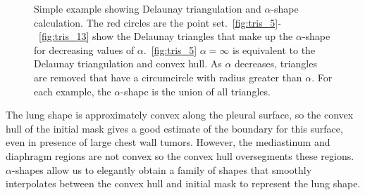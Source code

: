 \documentclass{llncs}
\begin{document}
\begin{figure}[ht!]
  \centering
  \caption{Simple example showing Delaunay triangulation and $\alpha$-shape calculation. The red circles are the point set.~\ref{fig:tris_5}-~\ref{fig:tris_13} show the Delaunay triangles that make up the $\alpha$-shape for decreasing values of $\alpha$.~\ref{fig:tris_5} $\alpha=\infty$ is equivalent to the Delaunay triangulation and convex hull. As $\alpha$ decreases, triangles are removed that have a circumcircle with radius greater than $\alpha$. For each example, the $\alpha$-shape is the union of all triangles.}
  \label{fig:star}
\end{figure}

The lung shape is approximately convex along the pleural surface, so the convex hull of the initial mask gives a good estimate of the boundary for this surface, even in presence of large chest wall tumors. However, the mediastinum and diaphragm regions are not convex so the convex hull oversegments these regions. $\alpha$-shapes allow us to elegantly obtain a family of shapes that smoothly interpolates between the convex hull and initial mask to represent the lung shape. 
\end{document}
